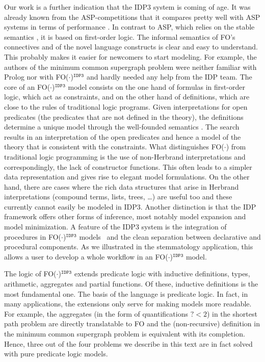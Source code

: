 \documentclass{tlp}
\newcommand{\idpdrie}{{\sc IDP3}\xspace}
\newcommand{\fodotidp}{{\sc FO($\cdot$)$^{\mathtt{IDP3}}$}\xspace}
\newcommand{\fodot}{{\sc FO($\cdot$)}\xspace}
\renewcommand{\|}{\ensuremath{\,|\,}}
\renewcommand{\|}{\,|\,}
\begin{document}
Our work is a further indication that the \idpdrie system is coming of
age. It was already known from the ASP-competitions that it compares
pretty well with ASP systems in terms of performance
\cite{lpnmr/DeneckerVBGT09,LPNRM/Calimeri11}. In contrast to ASP,
which relies on the stable semantics \cite{iclp/GelfondL88}, it is
based on first-order logic. The informal semantics of FO's connectives
and of the novel language constructs is clear and easy to understand.
This probably makes it easier for newcomers to start modeling.  For
example, the authors of the minimum common supergraph problem
\cite{ump} were neither familiar with Prolog nor with \fodotidp and
hardly needed any help from the IDP team.
%
The core of an \fodotidp model consists on the one hand of formulas in
first-order logic, which act as constraints, and on the other hand of
definitions, which are close to the rules of traditional logic
programs. Given interpretations for open predicates (the predicates
that are not defined in the theory), the definitions determine a
unique model through the well-founded semantics \cite{GelderRS91}. The
search results in an interpretation of the open predicates and hence a
model of the theory that is consistent with the constraints.  What
distinguishes \fodot from traditional logic programming is the use of
non-Herbrand interpretations and correspondingly, the lack of
constructor functions. This often leads to a simpler data
representation and gives rise to elegant model formulations. On the
other hand, there are cases where the rich data structures that arise
in Herbrand interpretations (compound terms, lists, trees, \ldots) are
useful too and these currently cannot easily be modeled in IDP3.
Another distinction is that the IDP framework offers other forms of
inference, most notably model expansion and model minimization. A
feature of the \idpdrie system is the integration of procedures in
\fodotidp models~\cite{inap/DePooterWD11} and the clean separation
between declarative and procedural components. As we illustrated in
the stemmatology application, this allows a user to develop a whole
workflow in an \fodotidp model.



The logic of \fodotidp extends predicate logic with inductive
definitions, types, arithmetic, aggregates and partial functions. Of
these, inductive definitions is the most fundamental one. The basis of
the language is predicate logic. In fact, in many applications, the
extensions only serve for making models more readable. For example,
the aggregates (in the form of quantifications $?<2$) in the shortest
path problem are directly translatable to FO and the (non-recursive)
definition in the minimum common supergraph problem is equivalent with
its completion.  Hence, three out of the four problems we describe in
this text are in fact solved with pure predicate logic models.
\end{document}

